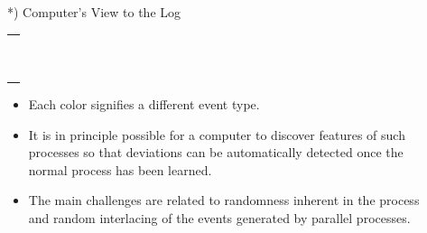 \documentclass[final,xcolor={usenames,x11names}]{beamer}
\newlength{\sepwid}
\newlength{\halfcolwid}
\begin{document}
\begin{frame}[t]
\begin{columns}[t]
\begin{column}{\halfcolwid}
\begin{alertblock}{*) Computer's View to the Log}
\begin{center}
{\begin{tabular}{|c|}
  \\
  \hline
  \cellcolor{PaleTurquoise2>wheel,2,11}\hspace{3cm}
  \\
  \hline
  \cellcolor{PaleTurquoise2>wheel,5,11}\hspace{3cm}
  \\
  \hline
  \cellcolor{PaleTurquoise2>wheel,6,11}\hspace{3cm}
  \\
  \hline
  \cellcolor{PaleTurquoise2>wheel,2,11}\hspace{3cm}
  \\
  \hline
  \cellcolor{PaleTurquoise2>wheel,7,11}\hspace{3cm}
  \\
  \hline
  \cellcolor{PaleTurquoise2>wheel,8,11}\hspace{3cm}
  \\
  \hline
  \cellcolor{PaleTurquoise2>wheel,2,11}\hspace{3cm}
  \\
  \hline
  \cellcolor{PaleTurquoise2>wheel,2,11}\hspace{3cm}
  \\
  \hline
  \cellcolor{PaleTurquoise2>wheel,10,11}\hspace{3cm}
  \\
  \hline
  \cellcolor{PaleTurquoise2>wheel,9,11}\hspace{3cm}
  \\
  \hline
  \cellcolor{PaleTurquoise2>wheel,10,11}\hspace{3cm}
  \\
  \hline
\end{tabular}
}
\end{center}

\begin{itemize}
\item Each color signifies a different event type.
\item It is in principle possible for a computer to discover features of such processes so that deviations can be automatically detected once the normal process has been learned.
\item The main challenges are related to randomness inherent in the process and random interlacing of the events generated by parallel processes.
\end{itemize}

\end{alertblock}


\end{column}

\begin{column}{\sepwid}\end{column} %

\end{columns}

\end{frame}
\end{document}
